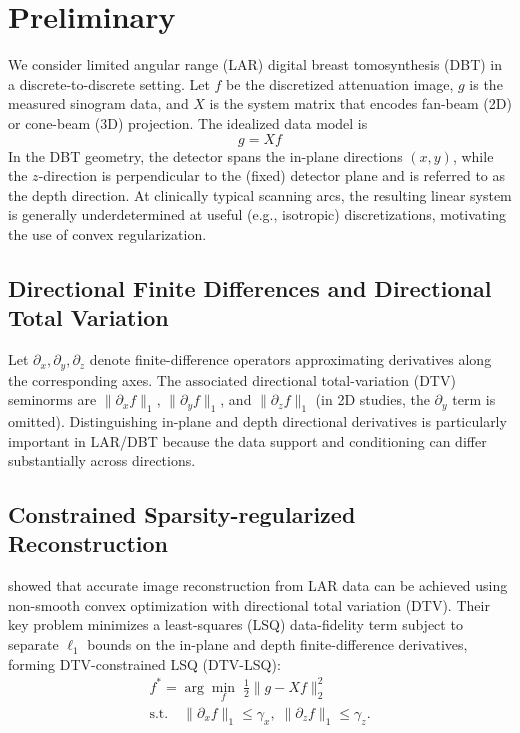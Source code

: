 \documentclass[journal, a4paper]{IEEEtran}
\begin{document}
\section{Preliminary}
We consider limited angular range (LAR) digital breast tomosynthesis (DBT) in a discrete-to-discrete setting. Let $f$ be the discretized attenuation image, $g$ is the measured sinogram data, and $X$ is the system matrix that encodes fan-beam (2D) or cone-beam (3D) projection. The idealized data model is
\begin{equation}
    g = Xf
\end{equation}
In the DBT geometry, the detector spans the in-plane directions $(x,y)$, while the $z$-direction is perpendicular to the (fixed) detector plane and is referred to as the depth direction. At clinically typical scanning arcs, the resulting linear system is generally underdetermined at useful (e.g., isotropic) discretizations, motivating the use of convex regularization.

\subsection{Directional Finite Differences and Directional Total Variation}
Let $\partial_x, \partial_y, \partial_z$ denote finite-difference operators approximating derivatives along the corresponding axes. The associated directional total-variation (DTV) seminorms are $\|\partial_x f\|_1$, $\|\partial_y f\|_1$, and $\|\partial_z f\|_1$ (in 2D studies, the $\partial_y$ term is omitted). Distinguishing in-plane and depth directional derivatives is particularly important in LAR/DBT because the data support and conditioning can differ substantially across directions.

\subsection{Constrained Sparsity-regularized Reconstruction}
\cite{zhang2021directional} showed that accurate image reconstruction from LAR data can be achieved using non-smooth convex optimization with directional total variation (DTV). Their key problem minimizes a least-squares (LSQ) data-fidelity term subject to separate $\ell_1$ bounds on the in-plane and depth finite-difference derivatives, forming DTV-constrained LSQ (DTV-LSQ):
\begin{equation}
    \begin{split}
        f^* = \arg\min_f \; \frac{1}{2}\|g - Xf\|_2^2 
\\
\text{s.t.} \quad
\|\partial_x f\|_1 \le \gamma_x, \;
\|\partial_z f\|_1 \le \gamma_z.
    \end{split}
\end{equation}
\end{document}
